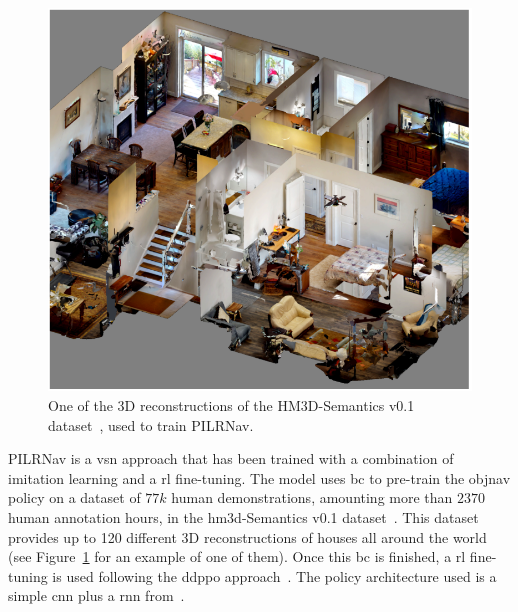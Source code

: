 \begin{figure}[t]
    \centering
    \includegraphics[width=\linewidth]{figures/ros4vsn/dataset_scene}
    \caption{One of the 3D reconstructions of the HM3D-Semantics v0.1 dataset~\cite{Ramakrishnan2021HabitatMatterport3D}, used to train PILRNav.}
    \label{fig:scene_hm3d}
\end{figure}

PILRNav is a \acrshort{vsn} approach that has been trained with a combination of imitation learning and a \acrshort{rl} fine-tuning.
The model uses \acrshort{bc} to pre-train the \acrshort{objnav} policy on a dataset of $77k$ human demonstrations, amounting more than $2370$ human annotation hours, in the \acrshort{hm3d}-Semantics v0.1 dataset~\cite{Ramakrishnan2021HabitatMatterport3D}.
This dataset provides up to 120 different 3D reconstructions of houses all around the world (see Figure~\ref{fig:scene_hm3d} for an example of one of them).
Once this \acrshort{bc} is finished, a \acrshort{rl} fine-tuning is used following the \acrshort{ddppo} approach~\cite{Wijmans2019DDPPOLN}.
The policy architecture used is a simple \acrshort{cnn} plus a \acrshort{rnn} from~\cite{yadav2022}.

